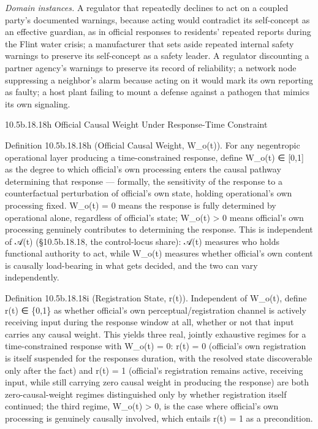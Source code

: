 \documentclass[
]{article}
\begin{document}
\emph{Domain instances.} A regulator that repeatedly declines to act on
a coupled party's documented warnings, because acting would contradict
its self-concept as an effective guardian, as in official responses to
residents' repeated reports during the Flint water crisis; a
manufacturer that sets aside repeated internal safety warnings to
preserve its self-concept as a safety leader. A regulator discounting a
partner agency's warnings to preserve its record of reliability; a
network node suppressing a neighbor's alarm because acting on it would
mark its own reporting as faulty; a host plant failing to mount a
defense against a pathogen that mimics its own signaling.

10.5b.18.18h Official Causal Weight Under Response-Time Constraint

Definition 10.5b.18.18h (Official Causal Weight, W\_o(t)). For any
negentropic operational layer producing a time-constrained response,
define W\_o(t) ∈ {[}0,1{]} as the degree to which official's own
processing enters the causal pathway determining that response ---
formally, the sensitivity of the response to a counterfactual
perturbation of official's own state, holding operational's own
processing fixed. W\_o(t) = 0 means the response is fully determined by
operational alone, regardless of official's state; W\_o(t)
\textgreater{} 0 means official's own processing genuinely contributes
to determining the response. This is independent of 𝒜(t) (§10.5b.18.18,
the control-locus share): 𝒜(t) measures who holds functional authority
to act, while W\_o(t) measures whether official's own content is
causally load-bearing in what gets decided, and the two can vary
independently.

Definition 10.5b.18.18i (Registration State, r(t)). Independent of
W\_o(t), define r(t) ∈ \{0,1\} as whether official's own
perceptual/registration channel is actively receiving input during the
response window at all, whether or not that input carries any causal
weight. This yields three real, jointly exhaustive regimes for a
time-constrained response with W\_o(t) = 0: r(t) = 0 (official's own
registration is itself suspended for the responses duration, with the
resolved state discoverable only after the fact) and r(t) = 1
(official's registration remains active, receiving input, while still
carrying zero causal weight in producing the response) are both
zero-causal-weight regimes distinguished only by whether registration
itself continued; the third regime, W\_o(t) \textgreater{} 0, is the
case where official's own processing is genuinely causally involved,
which entails r(t) = 1 as a precondition.
\end{document}
